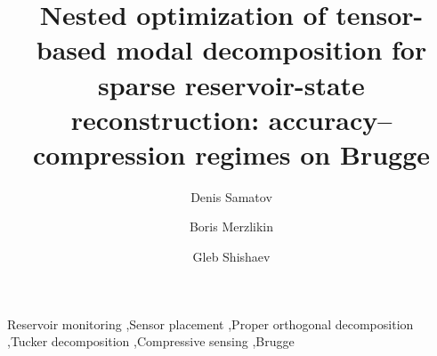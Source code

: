 \documentclass[preprint,12pt]{elsarticle}
\begin{document}
\linenumbers

\begin{frontmatter}

\title{Nested optimization of tensor-based modal decomposition for sparse reservoir-state reconstruction: accuracy--compression regimes on Brugge}

\author[inst1]{Denis Samatov}
\author[inst1]{Boris Merzlikin}
\author[inst1]{Gleb Shishaev}



\begin{keyword}
Reservoir monitoring \sep Sensor placement \sep Proper orthogonal decomposition \sep Tucker decomposition \sep Compressive sensing \sep Brugge
\end{keyword}

\end{frontmatter}














\end{document}
